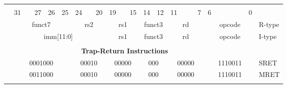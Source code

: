 
\newpage

\begin{table}[p]
\begin{small}
\begin{center}
    \begin{tabular} {p{0.002in}p{0.002in}p{0.002in}p{0.002in}p{0.002in}p{0.002in}p{0.002in}p{0.002in}p{0.002in}p{0.002in}p{0.002in}p{0.002in}p{0.002in}p{0.002in}p{0.002in}p{0.002in}p{0.002in}p{0.002in}p{0.002in}p{0.002in}p{0.002in}p{0.002in}p{0.002in}p{0.002in}p{0.002in}p{0.002in}p{0.002in}p{0.002in}p{0.002in}p{0.002in}p{0.002in}p{0.002in}p{0.002in}l}
    & & & & & & & & & & & & & & & & & & & & & & & & & & & & & & & & \\

            &

    \multicolumn{3}{l}{31} &
    \multicolumn{2}{r}{27} &
    \multicolumn{1}{c}{26} &
    \multicolumn{1}{r}{25} &
    \multicolumn{3}{l}{24} &
    \multicolumn{2}{r}{20} &
    \multicolumn{3}{l}{19} &
    \multicolumn{2}{r}{15} &
    \multicolumn{2}{l}{14} &
    \multicolumn{1}{r}{12} &
    \multicolumn{4}{l}{11} &
    \multicolumn{1}{r}{7} &
    \multicolumn{6}{l}{6} &
    \multicolumn{1}{r}{0} \\
    \cline{2-33}
&


\multicolumn{7}{|c|}{funct7} &
\multicolumn{5}{c|}{rs2} &
\multicolumn{5}{c|}{rs1} &
\multicolumn{3}{c|}{funct3} &
\multicolumn{5}{c|}{rd} &
\multicolumn{7}{|c|}{opcode} & R-type \\
\cline{2-33}
&

\multicolumn{12}{|c|}{imm[11:0]} &
\multicolumn{5}{c|}{rs1} &
\multicolumn{3}{c|}{funct3} &
\multicolumn{5}{c|}{rd} &
\multicolumn{7}{|c|}{opcode} & I-type \\
\cline{2-33}
&




\multicolumn{32}{c}{} & \\
\multicolumn{32}{c}{\bfseries Trap-Return Instructions } & \\
\cline{2-33}

            &
\multicolumn{7}{|c|}{0001000} &
\multicolumn{5}{c|}{00010} &
\multicolumn{5}{c|}{00000} &
\multicolumn{3}{c|}{000} &
\multicolumn{5}{c|}{00000} &
\multicolumn{7}{|c|}{1110011} & SRET \\
\cline{2-33}
&

\multicolumn{7}{|c|}{0011000} &
\multicolumn{5}{c|}{00010} &
\multicolumn{5}{c|}{00000} &
\multicolumn{3}{c|}{000} &
\multicolumn{5}{c|}{00000} &
\multicolumn{7}{|c|}{1110011} & MRET \\
\cline{2-33}
&





\end{tabular}
\end{center}
\end{small}
\end{table}
